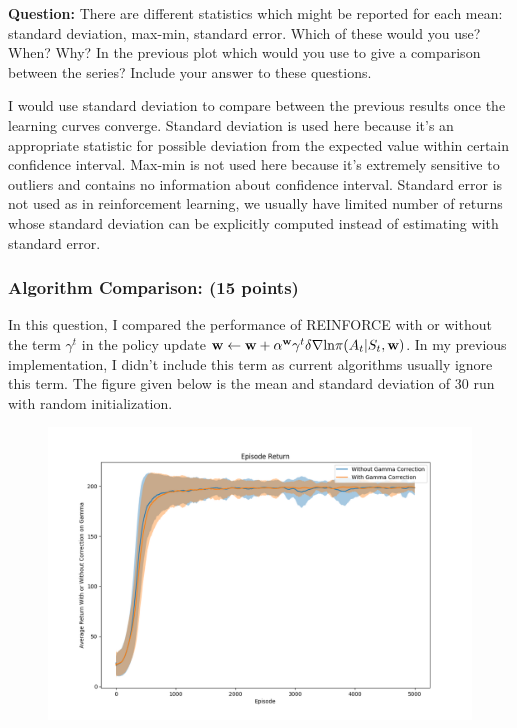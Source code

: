 \documentclass{article}
\newcommand{\w}{{\bf w}}
\begin{document}
\noindent\textbf{Question:} There are different statistics which might be reported for each mean: standard deviation, max-min, standard error. Which of these would you use? When? Why? In the previous plot which would you use to give a comparison between the series? Include your answer to these questions. 

I would use standard deviation to compare between the previous results once the learning curves converge. Standard deviation is used here because it's an appropriate statistic for possible deviation from the expected value within certain confidence interval. Max-min is not used here because it's extremely sensitive to outliers and contains no information about confidence interval. Standard error is not used as in reinforcement learning, we usually have limited number of returns whose standard deviation can be explicitly computed instead of estimating with standard error.




\subsubsection{Algorithm Comparison: (15 points)}

In this question, I compared the performance of REINFORCE with or without the term $ \gamma^t $ in the policy update $ \w \leftarrow{} \w + \alpha^{\w}\gamma^t \delta \nabla \text{ln} \pi(A_t|S_t,\w) $. In my previous implementation, I didn't include this term as current algorithms usually ignore this term. The figure given below is the mean and standard deviation of 30 run with random initialization.

\begin{figure}[H]
	\begin{center}
		\centerline{\includegraphics[scale=0.5]{img/gamma.png}}
	\end{center}
\end{figure}
\end{document}

